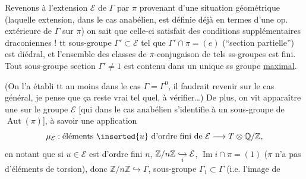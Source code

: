 Revenons à l'extension \(\mathcal E\) de \(\Gamma\) par \(\pi\)
provenant d'une situation géométrique
(laquelle extension, dans le cas anabélien, est définie déjà en termes
d'une op. extérieure de \(\Gamma\) sur \(\pi\))
on sait que celle-ci satisfait des conditions supplémentaires
draconiennes !
tt sous-groupe \(\Gamma'\subset\mathcal E\) tel que
\(\Gamma'\cap\pi=(e)\) (``section partielle'') est
 diédral,
et l'ensemble des classes de \(\pi\)-conjugaison de tels ss-groupes
est fini.
Tout sous-groupe section \(\Gamma'\ne1\) est contenu dans un unique
ss groupe  \uline{maximal}.

(On l'a établi tt au moins dans le cas
\(\Gamma=\Gamma^0\), il faudrait revenir sur le cas général,
je pense que ça reste vrai tel quel, à vérifier\ldots)
De plus, on vit apparaître une 
sur le groupe \(\mathcal E\)
[qui dans le cas anabélien s'identifie à un sous-groupe de
\(\operatorname{Aut}(\pi)\)], à savoir une application
\[
\mu_{\mathcal E}:
\text{éléments }\inserted{u}\text{ d'ordre fini de }\mathcal E
\longrightarrow T\otimes\mathbb Q/\mathbb Z,
\]
 en notant que si \(u\in\mathcal E\) est d'ordre fini
\(n\),  \(\mathbb Z/n\mathbb Z\lhook\joinrel\xrightarrow[i]{}
\mathcal E\),  \(\operatorname{Im}i\cap\pi=(1)\)
(\(\pi\) n'a pas d'éléments de torsion), donc
\(\mathbb Z/n\mathbb Z\hookrightarrow\Gamma\),  sous-groupe
\(\Gamma_1\subset\Gamma\) (i.e. l'image de

